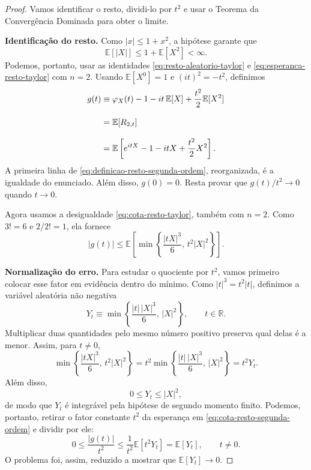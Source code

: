 \documentclass[12pt,portuguese]{article}
\theoremstyle{definition}
\theoremstyle{plainexercise}
\theoremstyle{starredexercise}
\theoremstyle{definition}
\begin{document}
\begin{proof}
Vamos identificar o resto, dividi-lo por $t^2$ e usar o Teorema da Convergência
Dominada para obter o limite.

\smallskip
\noindent\textbf{Identificação do resto.}
Como $|x|\leqslant1+x^2$, a hipótese garante que
\[
\mathbb{E}[|X|]\leqslant1+\mathbb{E}[X^2]<\infty.
\]
Podemos, portanto, usar as identidades
\eqref{eq:resto-aleatorio-taylor} e
\eqref{eq:esperanca-resto-taylor} com $n=2$.
Usando $\mathbb{E}[X^0]=1$ e $(it)^2=-t^2$, definimos
\begin{align}
g(t)
&\equiv\varphi_X(t)-1-it\,\mathbb{E}[X]
+\frac{t^2}{2}\mathbb{E}[X^2]\notag
\\[0.3cm]
&=\mathbb{E}[R_{2,t}]\notag
\\[0.3cm]
&=\mathbb{E}\left[e^{itX}-1-itX+\frac{t^2}{2}X^2\right].
\label{eq:definicao-resto-segunda-ordem}
\end{align}
A primeira linha de \eqref{eq:definicao-resto-segunda-ordem},
reorganizada, é a igualdade do enunciado. Além disso, $g(0)=0$.
Resta provar que $g(t)/t^2\to0$ quando $t\to0$.

Agora usamos a desigualdade \eqref{eq:cota-resto-taylor}, também
com $n=2$. Como $3!=6$ e $2/2!=1$, ela fornece
\begin{equation}\label{eq:cota-resto-segunda-ordem}
|g(t)|
\leqslant
\mathbb{E}\left[
\min\left\{
\frac{|tX|^3}{6},\,t^2|X|^2
\right\}
\right].
\end{equation}

\smallskip
\noindent\textbf{Normalização do erro.}
Para estudar o quociente por $t^2$, vamos primeiro colocar esse
fator em evidência dentro do mínimo. Como $|t|^3=t^2|t|$,
definimos a variável aleatória não negativa
\begin{equation}\label{eq:variavel-resto-normalizado}
Y_t\equiv
\min\left\{
\frac{|t|\,|X|^3}{6},\,|X|^2
\right\},
\qquad t\in\mathbb{R}.
\end{equation}
Multiplicar duas quantidades pelo mesmo número positivo preserva
qual delas é a menor. Assim, para $t\neq0$,
\[
\min\left\{
\frac{|tX|^3}{6},\,t^2|X|^2
\right\}
=t^2\min\left\{
\frac{|t|\,|X|^3}{6},\,|X|^2
\right\}
=t^2Y_t.
\]
Além disso,
\[
0\leqslant Y_t\leqslant|X|^2,
\]
de modo que $Y_t$ é integrável pela hipótese de segundo momento
finito. Podemos, portanto, retirar o fator constante $t^2$ da
esperança em \eqref{eq:cota-resto-segunda-ordem} e dividir por ele:
\begin{equation}\label{eq:resto-dividido}
0\leqslant\frac{|g(t)|}{t^2}
\leqslant\frac{1}{t^2}\mathbb{E}[t^2Y_t]
=\mathbb{E}[Y_t],
\qquad t\neq0.
\end{equation}
O problema foi, assim, reduzido a mostrar que
$\mathbb{E}[Y_t]\to0$.


\end{proof}
\end{document}
